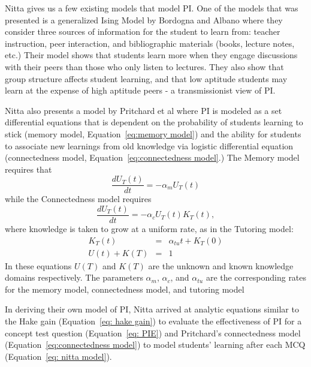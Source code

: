 \documentclass[twocolumn,secnumarabic,amssymb, nobibnotes, aps, prd]{revtex4-2}
\begin{document}
    Nitta \cite{nitta2019mathematical} gives us a few existing models that model PI. 
    One of the models that was presented is a generalized Ising Model by Bordogna and Albano \cite{bordogna2001theoretical,bordogna2003simulation} where they consider three sources of information for the student to learn from: teacher instruction, peer interaction, and bibliographic materials (books, lecture notes, etc.)
    Their model shows that students learn more when they engage discussions with their peers than those who only listen to lectures.
    They also show that group structure affects student learning, and that low aptitude students may learn at the expense of high aptitude peers - a transmissionist view of PI.

    Nitta also presents a model by Pritchard et al \cite{pritchard2008mathematical} where PI is modeled as a set differential equations that is dependent on the probability of students learning to stick (memory model, Equation~\ref{eq:memory model}) and the ability for students to associate new learnings from old knowledge via logistic differential equation (connectedness model, Equation~\ref{eq:connectedness model}.)
    The Memory model requires that
    \begin{equation}
        \label{eq:memory model}
        \frac{dU_T(t)}{dt} = -\alpha_m U_T(t)
    \end{equation}
    while the Connectedness model requires
    \begin{equation}
        \label{eq:connectedness model}
        \frac{dU_T(t)}{dt} = -\alpha_c U_T(t)K_T(t),
    \end{equation}
    where knowledge is taken to grow at a uniform rate, as in the Tutoring model:
    \begin{eqnarray}
        K_T(t) &=& \alpha_{tu}t + K_T(0) \label{eq:tutoring model} \\
        U(t) + K(T) &=& 1
    \end{eqnarray}
    In these equations $U(T)$ and $K(T)$ are the unknown and known knowledge domains respectively.
    The parameters $\alpha_m$, $\alpha_c$, and $\alpha_{tu}$ are the corresponding rates for the memory model, connectedness model, and tutoring model 

    In deriving their own model of PI, Nitta arrived at analytic equations similar to the Hake gain (Equation~\ref{eq: hake gain}) to evaluate the effectiveness of PI for a concept test question (Equation~\ref{eq: PIE}) and Pritchard's connectedness model (Equation~\ref{eq:connectedness model}) to model students' learning after each MCQ (Equation~\ref{eq: nitta model}).
\end{document}
